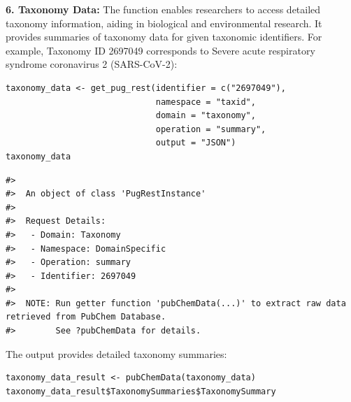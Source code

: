 \textbf{6. Taxonomy Data:} The function enables researchers to access detailed taxonomy information, aiding in biological and environmental research. It provides summaries of taxonomy data for given taxonomic identifiers. For example, Taxonomy ID 2697049 corresponds to Severe acute respiratory syndrome coronavirus 2 (SARS-CoV-2):

\begin{verbatim}
taxonomy_data <- get_pug_rest(identifier = c("2697049"), 
                              namespace = "taxid", 
                              domain = "taxonomy", 
                              operation = "summary", 
                              output = "JSON")
taxonomy_data
\end{verbatim}

\begin{verbatim}
#> 
#>  An object of class 'PugRestInstance'
#> 
#>  Request Details:  
#>   - Domain: Taxonomy
#>   - Namespace: DomainSpecific
#>   - Operation: summary
#>   - Identifier: 2697049
#> 
#>  NOTE: Run getter function 'pubChemData(...)' to extract raw data retrieved from PubChem Database. 
#>        See ?pubChemData for details.
\end{verbatim}

The output provides detailed taxonomy summaries:

\begin{verbatim}
taxonomy_data_result <- pubChemData(taxonomy_data)
taxonomy_data_result$TaxonomySummaries$TaxonomySummary
\end{verbatim}


